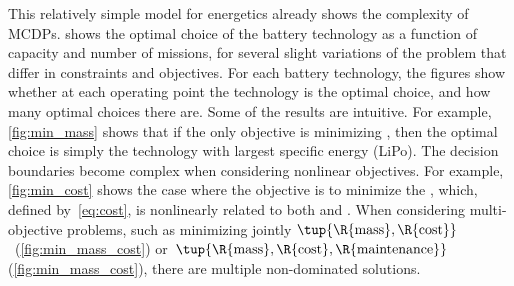 This relatively simple model for energetics already shows the complexity of MCDPs.
 shows the optimal choice of the battery technology as a function of capacity and number of missions, for several slight variations of the problem that differ in constraints and objectives.
For each battery technology, the figures show whether at each operating point the technology is the optimal choice, and how many optimal choices there are.
Some of the results are intuitive.
For example, \cref{fig:min_mass} shows that if the only objective is minimizing , then the optimal choice is simply the technology with largest specific energy (LiPo).
The decision boundaries become complex when considering nonlinear objectives.
For example, \cref{fig:min_cost} shows the case where the objective is to minimize the , which, defined by~\cref{eq:cost}, is nonlinearly related to both  and .
When considering multi-objective problems, such as minimizing jointly $\tup{ \R{\text{mass}},\R{\text{cost}}} $~(\cref{fig:min_mass_cost}) or~$\tup{ \R{\text{mass}},\R{\text{cost}},\R{\text{maintenance}}} $ (\cref{fig:min_mass_cost}), there are multiple non-dominated solutions.

